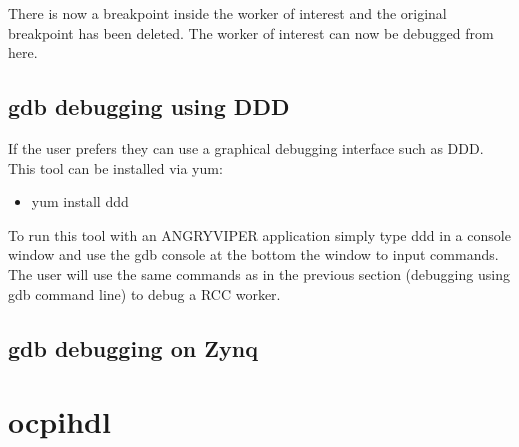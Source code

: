 \begin{flushleft}
There is now a breakpoint inside the worker of interest and the original breakpoint has been deleted.  The worker of interest can now be debugged from here.

\subsection{gdb debugging using DDD}
	If the user prefers they can use a graphical debugging interface such as DDD.  This tool can be installed via yum:
	\begin{itemize}
	    \item yum install ddd
	\end{itemize}
To run this tool with an ANGRYVIPER application simply type ddd in a console window and use the gdb console at the bottom the window to input commands.  The user will use the same commands as in the previous section (debugging using gdb command line) to debug a RCC worker.

\subsection{gdb debugging on Zynq}




\end{flushleft}
\section{ocpihdl}
